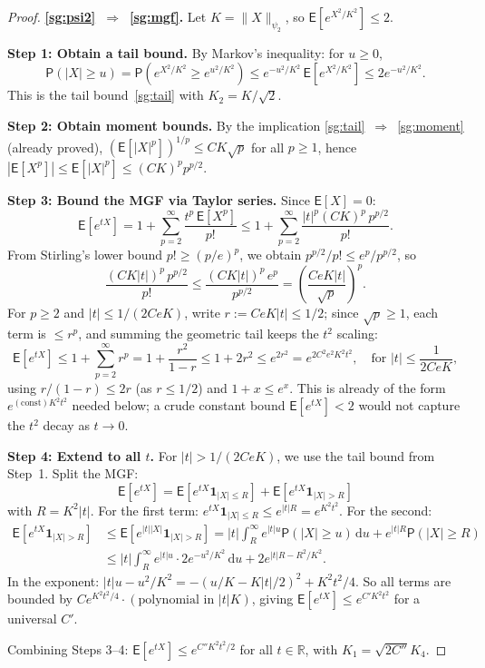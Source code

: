 \documentclass[14pt]{extarticle}
\theoremstyle{plain}
\theoremstyle{definition}
\theoremstyle{remark}
\newcommand\expc{\mathsf{E}}
\newcommand\prb{\mathsf{P}}
\newcommand{\Real}{\mathbb{R}}
\newcommand{\dd}{\mathrm{d}}
\begin{document}
\begin{proof}
\medskip\noindent\textbf{\ref{sg:psi2}~$\Rightarrow$~\ref{sg:mgf}.} Let $K = \|X\|_{\psi_2}$, so $\expc[e^{X^2/K^2}] \leqslant 2$.

\textbf{Step 1: Obtain a tail bound.} By Markov's inequality: for $u \geqslant 0$,
\[
\prb(|X| \geqslant u) = \prb(e^{X^2/K^2} \geqslant e^{u^2/K^2}) \leqslant e^{-u^2/K^2}\,\expc[e^{X^2/K^2}] \leqslant 2e^{-u^2/K^2}.
\]
This is the tail bound~\ref{sg:tail} with $K_2 = K/\sqrt{2}$.

\textbf{Step 2: Obtain moment bounds.} By the implication \ref{sg:tail}~$\Rightarrow$~\ref{sg:moment} (already proved), $(\expc[|X|^p])^{1/p} \leqslant CK\sqrt{p}$ for all $p \geqslant 1$, hence $|\expc[X^p]| \leqslant \expc[|X|^p] \leqslant (CK)^p p^{p/2}$.

\textbf{Step 3: Bound the MGF via Taylor series.} Since $\expc[X] = 0$:
\[
\expc[e^{tX}] = 1 + \sum_{p=2}^{\infty}\frac{t^p\,\expc[X^p]}{p!} \leqslant 1 + \sum_{p=2}^{\infty}\frac{|t|^p(CK)^p\,p^{p/2}}{p!}.
\]
From Stirling's lower bound $p! \geqslant (p/e)^p$, we obtain $p^{p/2}/p! \leqslant e^p/p^{p/2}$, so
\[
\frac{(CK|t|)^p\,p^{p/2}}{p!} \leqslant \frac{(CK|t|)^p\,e^p}{p^{p/2}} = \left(\frac{CeK|t|}{\sqrt{p}}\right)^p.
\]
For $p \geqslant 2$ and $|t| \leqslant 1/(2CeK)$, write $r := CeK|t| \leqslant 1/2$; since $\sqrt{p} \geqslant 1$, each term is $\leqslant r^p$, and summing the geometric tail keeps the $t^2$ scaling:
\[
\expc[e^{tX}] \leqslant 1 + \sum_{p=2}^\infty r^p = 1 + \frac{r^2}{1-r} \leqslant 1 + 2r^2 \leqslant e^{2r^2} = e^{2C^2e^2K^2t^2}, \quad \text{for } |t| \leqslant \frac{1}{2CeK},
\]
using $r/(1-r) \leqslant 2r$ (as $r \leqslant 1/2$) and $1 + x \leqslant e^x$. This is already of the form $e^{(\text{const})K^2t^2}$ needed below; a crude constant bound $\expc[e^{tX}] < 2$ would not capture the $t^2$ decay as $t \to 0$.

\textbf{Step 4: Extend to all $t$.} For $|t| > 1/(2CeK)$, we use the tail bound from Step~1. Split the MGF:
\[
\expc[e^{tX}] = \expc[e^{tX}\mathbf{1}_{|X| \leqslant R}] + \expc[e^{tX}\mathbf{1}_{|X| > R}]
\]
with $R = K^2|t|$. For the first term: $e^{tX}\mathbf{1}_{|X| \leqslant R} \leqslant e^{|t|R} = e^{K^2t^2}$. For the second:
\begin{align*}
\expc[e^{tX}\mathbf{1}_{|X|>R}] &\leqslant \expc[e^{|t||X|}\mathbf{1}_{|X|>R}] = |t|\int_R^\infty e^{|t|u}\prb(|X| \geqslant u)\,\dd u + e^{|t|R}\prb(|X| \geqslant R)\\
&\leqslant |t|\int_R^\infty e^{|t|u}\cdot 2e^{-u^2/K^2}\,\dd u + 2e^{|t|R - R^2/K^2}.
\end{align*}
In the exponent: $|t|u - u^2/K^2 = -(u/K - K|t|/2)^2 + K^2t^2/4$. So all terms are bounded by $Ce^{K^2t^2/4}\cdot(\text{polynomial in }|t|K)$, giving $\expc[e^{tX}] \leqslant e^{C'K^2t^2}$ for a universal $C'$.

Combining Steps 3--4: $\expc[e^{tX}] \leqslant e^{C''K^2t^2/2}$ for all $t \in \Real$, with $K_1 = \sqrt{2C''}K_4$.
\end{proof}
\end{document}
